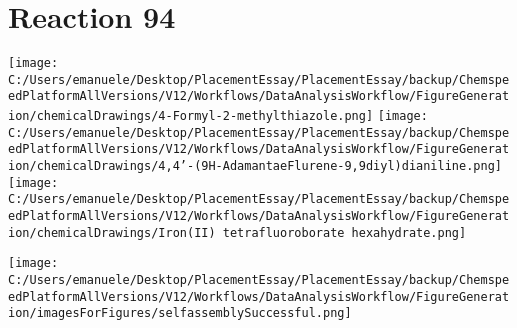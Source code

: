 \documentclass{article}%
\begin{document}
\section*{Reaction 94}%
%
\begin{scheme}[H]%
\begin{minipage}{0.5\textwidth}%
\texttt{[image: C:/Users/emanuele/Desktop/PlacementEssay/PlacementEssay/backup/ChemspeedPlatformAllVersions/V12/Workflows/DataAnalysisWorkflow/FigureGeneration/chemicalDrawings/4-Formyl-2-methylthiazole.png]}%
\texttt{[image: C:/Users/emanuele/Desktop/PlacementEssay/PlacementEssay/backup/ChemspeedPlatformAllVersions/V12/Workflows/DataAnalysisWorkflow/FigureGeneration/chemicalDrawings/4,4'-(9H-AdamantaeFlurene-9,9diyl)dianiline.png]}%
\texttt{[image: C:/Users/emanuele/Desktop/PlacementEssay/PlacementEssay/backup/ChemspeedPlatformAllVersions/V12/Workflows/DataAnalysisWorkflow/FigureGeneration/chemicalDrawings/Iron(II) tetrafluoroborate hexahydrate.png]}%
\end{minipage}%
\begin{minipage}{0.5\textwidth}%
\begin{center}%
\texttt{[image: C:/Users/emanuele/Desktop/PlacementEssay/PlacementEssay/backup/ChemspeedPlatformAllVersions/V12/Workflows/DataAnalysisWorkflow/FigureGeneration/imagesForFigures/selfassemblySuccessful.png]}%
\end{center}%
\end{minipage}%
\caption{Self-assembly of components 1, 13, with Iron(II) in a 3.0:1.5:1.0 molar ratio in CH$_3$CN at 60\textdegree C for 40h. These are the reagents (starting materials) for reaction 94.}%
\end{scheme}%
\end{document}
